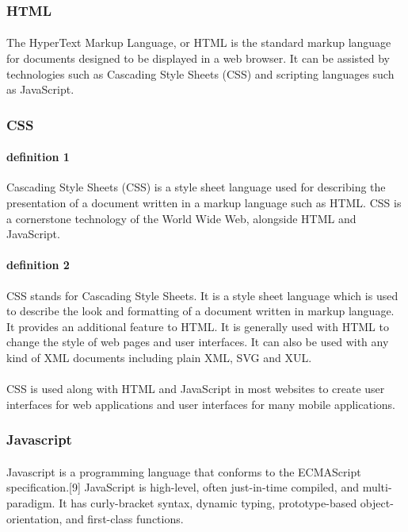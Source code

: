 \documentclass{article}
\begin{document}
	\subsubsection{HTML}
	\paragraph{}
	The HyperText Markup Language, or HTML is the standard markup language for documents designed to be displayed in a web browser. It can be assisted by technologies such as Cascading Style Sheets (CSS) and scripting languages such as JavaScript.
	\subsubsection{CSS}
	\paragraph{definition 1}
	Cascading Style Sheets (CSS) is a style sheet language used for describing the presentation of a document written in a markup language such as HTML. CSS is a cornerstone technology of the World Wide Web, alongside HTML and JavaScript.
	\paragraph{definition 2}
	CSS stands for Cascading Style Sheets. It is a style sheet language which is used to describe the look and formatting of a document written in markup language. It provides an additional feature to HTML. It is generally used with HTML to change the style of web pages and user interfaces. It can also be used with any kind of XML documents including plain XML, SVG and XUL.
	\paragraph{}
	CSS is used along with HTML and JavaScript in most websites to create user interfaces for web applications and user interfaces for many mobile applications.
	\subsubsection{Javascript}
	\paragraph{}
	Javascript is a programming language that conforms to the ECMAScript specification.[9] JavaScript is high-level, often just-in-time compiled, and multi-paradigm. It has curly-bracket syntax, dynamic typing, prototype-based object-orientation, and first-class functions.
\end{document}
